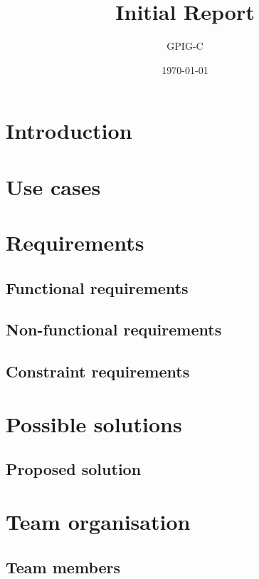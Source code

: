 \documentclass[10pt,a4paper]{article}
\begin{document}
\title{Initial Report}
\author{GPIG-C}
\date{\today}
\maketitle
\thispagestyle{fancy} %

\section{Introduction}


\section{Use cases}


\section{Requirements}

\subsection{Functional requirements}

\subsection{Non-functional requirements}

\subsection{Constraint requirements}


\section{Possible solutions}

\subsection{Proposed solution}


\section{Team organisation}

\subsection{Team members}
\end{document}
